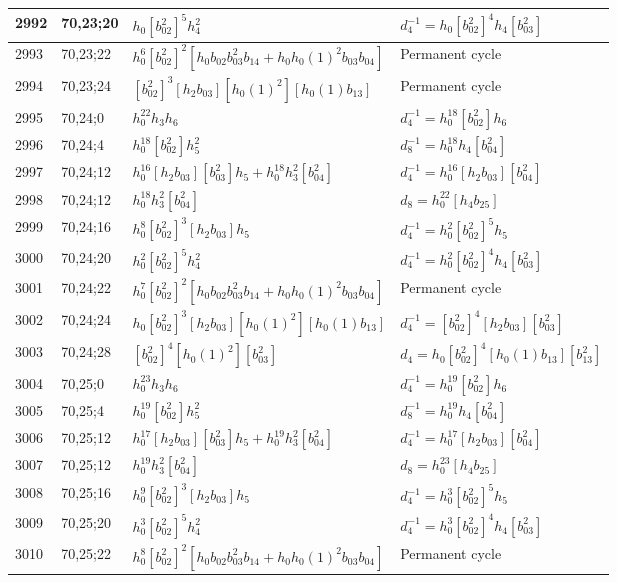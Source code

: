 \documentclass{article}
\begin{document}
\begin{longtable}{|l|l|>{\raggedright\arraybackslash}p{6cm}|>{\raggedright\arraybackslash}p{6cm}|}
\hline
2992 & 70,23;20 & $h_0[b_{02}^2]^5h_4^2$ & $d_{4}^{-1}=h_0[b_{02}^2]^4h_4[b_{03}^2]$\\
\hline
2993 & 70,23;22 & $h_0^6[b_{02}^2]^2[h_0b_{02}b_{03}^2b_{14} + h_0h_0(1)^2b_{03}b_{04}]$ & Permanent cycle\\
\hline
2994 & 70,23;24 & $[b_{02}^2]^3[h_2b_{03}][h_0(1)^2][h_0(1)b_{13}]$ & Permanent cycle\\
\hline
2995 & 70,24;0 & $h_0^{22}h_3h_6$ & $d_{4}^{-1}=h_0^{18}[b_{02}^2]h_6$\\
\hline
2996 & 70,24;4 & $h_0^{18}[b_{02}^2]h_5^2$ & $d_{8}^{-1}=h_0^{18}h_4[b_{04}^2]$\\
\hline
2997 & 70,24;12 & $h_0^{16}[h_2b_{03}][b_{03}^2]h_5 + h_0^{18}h_3^2[b_{04}^2]$ & $d_{4}^{-1}=h_0^{16}[h_2b_{03}][b_{04}^2]$\\
2998 & 70,24;12 & $h_0^{18}h_3^2[b_{04}^2]$ &$d_{8}=h_0^{22}[h_4b_{25}]$\\
\hline
2999 & 70,24;16 & $h_0^8[b_{02}^2]^3[h_2b_{03}]h_5$ & $d_{4}^{-1}=h_0^2[b_{02}^2]^5h_5$\\
\hline
3000 & 70,24;20 & $h_0^2[b_{02}^2]^5h_4^2$ & $d_{4}^{-1}=h_0^2[b_{02}^2]^4h_4[b_{03}^2]$\\
\hline
3001 & 70,24;22 & $h_0^7[b_{02}^2]^2[h_0b_{02}b_{03}^2b_{14} + h_0h_0(1)^2b_{03}b_{04}]$ & Permanent cycle\\
\hline
3002 & 70,24;24 & $h_0[b_{02}^2]^3[h_2b_{03}][h_0(1)^2][h_0(1)b_{13}]$ & $d_{4}^{-1}=[b_{02}^2]^4[h_2b_{03}][b_{03}^2]$\\
\hline
3003 & 70,24;28 & $[b_{02}^2]^4[h_0(1)^2][b_{03}^2]$ &$d_{4}=h_0[b_{02}^2]^4[h_0(1)b_{13}][b_{13}^2]$\\
\hline
3004 & 70,25;0 & $h_0^{23}h_3h_6$ & $d_{4}^{-1}=h_0^{19}[b_{02}^2]h_6$\\
\hline
3005 & 70,25;4 & $h_0^{19}[b_{02}^2]h_5^2$ & $d_{8}^{-1}=h_0^{19}h_4[b_{04}^2]$\\
\hline
3006 & 70,25;12 & $h_0^{17}[h_2b_{03}][b_{03}^2]h_5 + h_0^{19}h_3^2[b_{04}^2]$ & $d_{4}^{-1}=h_0^{17}[h_2b_{03}][b_{04}^2]$\\
3007 & 70,25;12 & $h_0^{19}h_3^2[b_{04}^2]$ &$d_{8}=h_0^{23}[h_4b_{25}]$\\
\hline
3008 & 70,25;16 & $h_0^9[b_{02}^2]^3[h_2b_{03}]h_5$ & $d_{4}^{-1}=h_0^3[b_{02}^2]^5h_5$\\
\hline
3009 & 70,25;20 & $h_0^3[b_{02}^2]^5h_4^2$ & $d_{4}^{-1}=h_0^3[b_{02}^2]^4h_4[b_{03}^2]$\\
\hline
3010 & 70,25;22 & $h_0^8[b_{02}^2]^2[h_0b_{02}b_{03}^2b_{14} + h_0h_0(1)^2b_{03}b_{04}]$ & Permanent cycle\\

\end{longtable}
\end{document}
